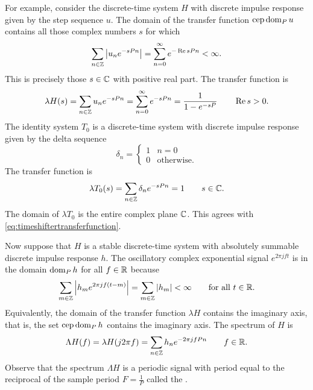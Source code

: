 For example, consider the discrete-time system $H$ with discrete impulse response given by the step sequence $u$.  The domain of the transfer function $\operatorname{cep} \operatorname{dom}_P u$ contains all those complex numbers $s$ for which
\[
\sum_{n \in {\mathbb Z}} \left\vert u_n e^{-sPn} \right\vert = \sum_{n = 0}^\infty e^{-\operatorname{Re} s Pn} < \infty.
\]
This is precisely those $s \in {\mathbb C}$ with positive real part.  The transfer function is
\[
\lambda H(s) = \sum_{n \in {\mathbb Z}} u_n e^{-sPn} = \sum_{n = 0}^\infty e^{-sPn} = \frac{1}{1 - e^{-sP}} \qquad \operatorname{Re} s > 0.
\]
The identity system $T_0$ is a discrete-time system with discrete impulse response given by the delta sequence
\[
\delta_n = \begin{cases}
1 & n = 0 \\
0 & \text{otherwise}.
\end{cases}
\]  
The transfer function is 
\[
\lambda T_0(s) = \sum_{n \in {\mathbb Z}} \delta_n e^{-sPn} = 1 \qquad s \in {\mathbb C}.
\]
The domain of $\lambda T_0$ is the entire complex plane ${\mathbb C}$.  This agrees with \eqref{eq:timeshiftertransferfunction}.  %


Now suppose that $H$ is a stable discrete-time system with absolutely summable discrete impulse response $h$.  The oscillatory complex exponential signal $e^{2\pi j f t}$ is in the domain $\operatorname{dom}_P h$ for all $f \in {\mathbb R}$ because
\[
\sum_{m \in {\mathbb Z}} \left\vert h_m e^{2\pi j f (t - m)} \right\vert = \sum_{m \in {\mathbb Z}} \left\vert h_m \right\vert < \infty \qquad \text{for all $t \in {\mathbb R}$}.
\]
Equivalently, the domain of the transfer function $\lambda H$ contains the imaginary axis, that is, the set $\operatorname{cep} \operatorname{dom}_P h$ contains the imaginary axis.  The spectrum of $H$ is
\[
\Lambda H(f) = \lambda H (j2\pi f) = \sum_{n \in {\mathbb Z}} h_n e^{-2\pi j f P n} \qquad f \in {\mathbb R}.
\]
Observe that the spectrum $\Lambda H$ is a periodic signal with period equal to the reciprocal of the sample period $F = \frac{1}{P}$ called the .  

